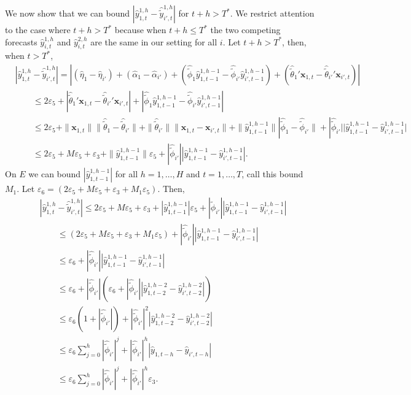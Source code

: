 \documentclass[11pt]{article}
\newcommand{\x}{\textbf{x}}
\theoremstyle{definition}
\begin{document}
We now show that we can bound $|\hat{y}_{1,t}^{1,h} - \hat{\tilde{y}}_{i',t}^{1,h}|$ for $t+h > T^*$. We restrict attention to the case where $t+h > T^*$ because when $t+h \leq T^*$ the two competing forecasts $\hat{y}_{i,t}^{1,h}$ and $\hat{y}_{i,t}^{2,h}$ are the same in our setting for all $i$. Let $t+h > T^*$, then, when $t > T^*$,
\begin{align*}
  &|\hat{y}_{1,t}^{1,h} - \hat{\tilde{y}}_{i',t}^{1,h}| = |(\hat\eta_1 - \hat{\eta}_{i'}) + (\hat\alpha_1 - \hat\alpha_{i'}) + (\hat{\tilde{\phi}}_1 \hat{y}_{1,t-1}^{1,h-1} -  \hat{\tilde{\phi}}_{i'} \hat{y}_{i',t-1}^{1,h-1}) + (\hat{\tilde{\theta}}_1' \x_{1,t} - \hat{\tilde{\theta}}_{i'}' \x_{i',t})| \\
  &\qquad \leq 2\varepsilon_5 + |\hat{\tilde{\theta}}_1' \x_{1,t} - \hat{\tilde{\theta}}_{i'}' \x_{i',t}| + |\hat{\tilde{\phi}}_1 \hat{y}_{1,t-1}^{1,h-1} -  \hat{\tilde{\phi}}_{i'} \hat{y}_{i',t-1}^{1,h-1}| \\
  &\qquad \leq 2\varepsilon_5 + \|\x_{1,t}\|\|\hat{\tilde{\theta}}_1 - \hat{\tilde{\theta}}_{i'}\| + \|\hat{\tilde{\theta}}_{i'}\| \|\x_{1,t} - \x_{i',t}\| + \|\hat{y}_{1,t-1}^{1,h-1}\| |\hat{\tilde{\phi}}_1 - \hat{\tilde{\phi}}_{i'}\| + |\hat{\tilde{\phi}}_{i'}| |\hat{y}_{1,t-1}^{1,h-1} - \hat{y}_{i',t-1}^{1,h-1} | \\
  &\qquad \leq 2\varepsilon_5 + M\varepsilon_5 + \varepsilon_3 + \|\hat{y}_{1,t-1}^{1,h-1}\|\varepsilon_5 + |\hat{\tilde{\phi}}_{i'}| |\hat{y}_{1,t-1}^{1,h-1} - \hat{y}_{i',t-1}^{1,h-1} |.
\end{align*}
On $E$ we can bound $|\hat{y}_{1,t-1}^{1,h-1}|$ for all $h=1,\ldots,H$ and $t=1,\ldots,T$, call this bound $M_1$. Let $\varepsilon_6 = (2\varepsilon_5 + M\varepsilon_5 + \varepsilon_3 + M_1\varepsilon_5)$. Then,
\begin{align*}
  &|\hat{y}_{1,t}^{1,h} - \hat{\tilde{y}}_{i',t}^{1,h}| \leq 2\varepsilon_5 + M\varepsilon_5 + \varepsilon_3 + |\hat{y}_{1,t-1}^{1,h-1}|\varepsilon_5 + |\hat{\tilde{\phi}}_{i'}| |\hat{y}_{1,t-1}^{1,h-1} - \hat{y}_{i',t-1}^{1,h-1}| \\
  &\qquad \leq (2\varepsilon_5 + M\varepsilon_5 + \varepsilon_3 + M_1\varepsilon_5) + |\hat{\tilde{\phi}}_{i'}| |\hat{y}_{1,t-1}^{1,h-1} - \hat{y}_{i',t-1}^{1,h-1}| \\
  &\qquad \leq \varepsilon_6 + |\hat{\tilde{\phi}}_{i'}| |\hat{y}_{1,t-1}^{1,h-1} - \hat{y}_{i',t-1}^{1,h-1}| \\
  &\qquad \leq \varepsilon_6 + |\hat{\tilde{\phi}}_{i'}|\left(\varepsilon_6 + |\hat{\tilde{\phi}}_{i'}| |\hat{y}_{1,t-2}^{1,h-2} - \hat{y}_{i',t-2}^{1,h-2}|\right) \\
  &\qquad \leq \varepsilon_6(1 + |\hat{\tilde{\phi}}_{i'}|) + |\hat{\tilde{\phi}}_{i'}|^2|\hat{y}_{1,t-2}^{1,h-2} - \hat{y}_{i',t-2}^{1,h-2}| \\  
  &\qquad \leq \varepsilon_6 \sum_{j=0}^h |\hat{\tilde{\phi}}_{i'}|^j + |\hat{\tilde{\phi}}_{i'}|^h|\hat{y}_{1,t-h} - \hat{y}_{i',t-h}| \\
  &\qquad \leq \varepsilon_6 \sum_{j=0}^h |\hat{\tilde{\phi}}_{i'}|^j + |\hat{\tilde{\phi}}_{i'}|^h\varepsilon_3.  
\end{align*}
\end{document}
